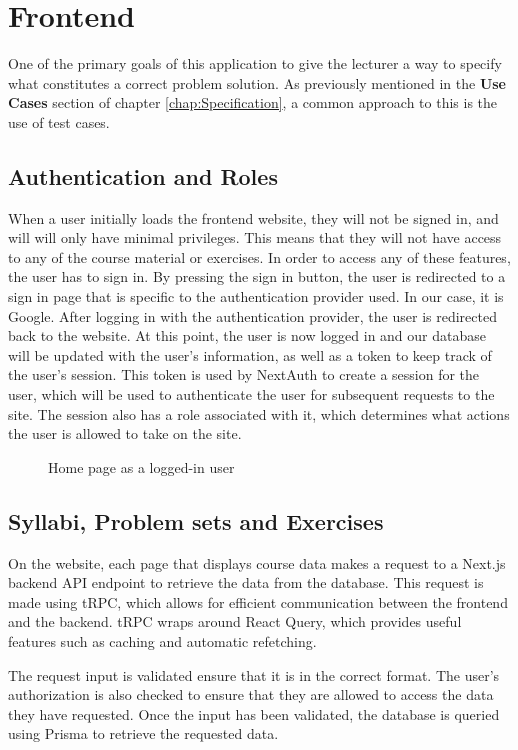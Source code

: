 \chapter{Frontend} \label{chap:Frontend}
One of the primary goals of this application to give the lecturer a way to specify what constitutes a correct problem solution.
As previously mentioned in the \textbf{Use Cases} section of chapter \ref{chap:Specification}, a common approach to this is the use of test cases.

\section{Authentication and Roles}
When a user initially loads the frontend website, they will not be signed in, and will will only have minimal privileges.
This means that they will not have access to any of the course material or exercises.
In order to access any of these features, the user has to sign in.
By pressing the sign in button, the user is redirected to a sign in page that is specific to the authentication provider used.
In our case, it is Google.
After logging in with the authentication provider, the user is redirected back to the website.
At this point, the user is now logged in and our database will be updated with the user's information, as well as a token to keep track of the user's session.
This token is used by NextAuth to create a session for the user, which will be used to authenticate the user for subsequent requests to the site.
The session also has a role associated with it, which determines what actions the user is allowed to take on the site.

\begin{figure}[H]
    \centering
    \caption{Home page as a logged-in user}
    \label{fig:Home page}
\end{figure}

\section{Syllabi, Problem sets and Exercises}
On the website, each page that displays course data makes a request to a Next.js backend API endpoint to retrieve the data from the database.
This request is made using tRPC, which allows for efficient communication between the frontend and the backend. tRPC wraps around React Query, which provides useful features such as caching and automatic refetching.

The request input is validated  ensure that it is in the correct format.
The user's authorization is also checked to ensure that they are allowed to access the data they have requested.
Once the input has been validated, the database is queried using Prisma to retrieve the requested data.

